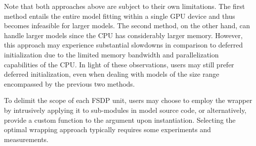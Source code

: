 

Note that both approaches above are subject to their own limitations. The first method entails the entire model fitting within a single GPU device and thus becomes infeasible for larger models. The second method, on the other hand, can handle larger models since the CPU has considerably larger memory. However, this approach may experience substantial slowdowns in comparison to deferred initialization due to the limited memory bandwidth and parallelization capabilities of the CPU. In light of these observations, users may still prefer deferred initialization, even when dealing with models of the size range encompassed by the previous two methods.



To delimit the scope of each FSDP unit, users may choose to employ the  wrapper by intrusively applying it to sub-modules in model source code, or alternatively, provide a custom function to the  argument upon instantiation. Selecting the optimal wrapping approach typically requires some experiments and measurements.
